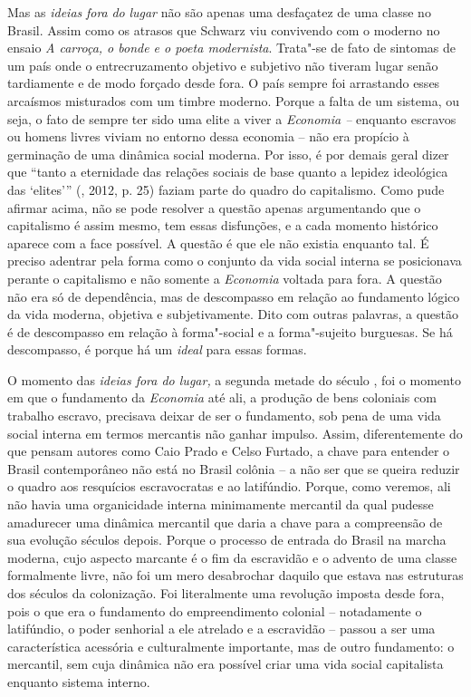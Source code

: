 Mas as \emph{ideias} \emph{fora} \emph{do} \emph{lugar} não são apenas
uma desfaçatez de uma classe no Brasil. Assim como os atrasos que
Schwarz viu convivendo com o moderno no ensaio \emph{A carroça, o bonde
e o poeta modernista}. Trata"-se de fato de sintomas de um país onde o
entrecruzamento objetivo e subjetivo não tiveram lugar senão tardiamente
e de modo forçado desde fora. O país sempre foi arrastando esses arcaísmos
misturados com um timbre moderno. Porque a falta de um sistema, ou seja,
o fato de sempre ter sido uma elite a viver a \emph{Economia --}
enquanto escravos ou homens livres viviam no entorno dessa economia --
não era propício à germinação de uma dinâmica social moderna. Por isso,
é por demais geral dizer que ``tanto a eternidade das relações sociais
de base quanto a lepidez ideológica das `elites''' (, 2012, p.
25) faziam parte do quadro do capitalismo. Como pude afirmar acima, não se
pode resolver a questão apenas argumentando que o capitalismo é assim
mesmo, tem essas disfunções, e a cada momento histórico aparece com a
face possível. A questão é que ele não existia enquanto tal. É
preciso adentrar pela forma como o conjunto da vida social interna
se posicionava perante o capitalismo e não somente a \emph{Economia}
voltada para fora. A questão não era só de dependência, mas de
descompasso em relação ao fundamento lógico da vida moderna, objetiva e
subjetivamente. Dito com outras palavras, a questão é de descompasso em
relação à forma"-social e a forma"-sujeito burguesas. Se há descompasso, é
porque há um \emph{ideal} para essas formas.

O momento das \emph{ideias fora do lugar,} a segunda metade do século
, foi o momento em que o fundamento da \emph{Economia} até ali, a
produção de bens coloniais com trabalho escravo, precisava deixar de ser
o fundamento, sob pena de uma vida social interna em termos mercantis
não ganhar impulso. Assim, diferentemente do que pensam autores como
Caio Prado e Celso Furtado, a chave para entender o Brasil contemporâneo
não está no Brasil colônia -- a não ser que se queira reduzir o quadro
aos resquícios escravocratas e ao latifúndio. Porque, como veremos, ali
não havia uma organicidade interna minimamente mercantil da qual pudesse
amadurecer uma dinâmica mercantil que daria a chave para a compreensão
de sua evolução séculos depois. Porque o processo de entrada do Brasil
na marcha moderna, cujo aspecto marcante é o fim da escravidão e o
advento de uma classe formalmente livre, não foi um mero desabrochar
daquilo que estava nas estruturas dos séculos da colonização. Foi
literalmente uma revolução imposta desde fora, pois o que era o fundamento do
empreendimento colonial -- notadamente o latifúndio, o poder senhorial a
ele atrelado e a escravidão -- passou a ser uma característica acessória
e culturalmente importante, mas de outro fundamento: o mercantil, sem
cuja dinâmica não era possível criar uma vida social capitalista
enquanto sistema interno.

